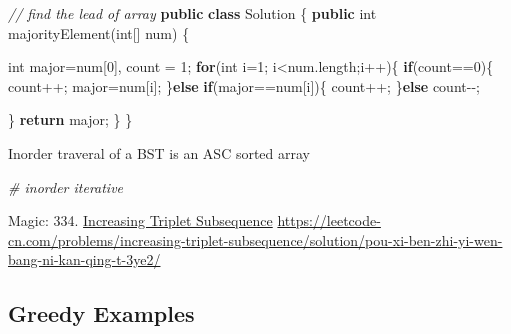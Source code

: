 \documentclass[
]{article}
\newenvironment{Shaded}{}{}
\newcommand{\CommentTok}[1]{\textcolor[rgb]{0.38,0.63,0.69}{\textit{#1}}}
\newcommand{\ControlFlowTok}[1]{\textcolor[rgb]{0.00,0.44,0.13}{\textbf{#1}}}
\newcommand{\DataTypeTok}[1]{\textcolor[rgb]{0.56,0.13,0.00}{#1}}
\newcommand{\DecValTok}[1]{\textcolor[rgb]{0.25,0.63,0.44}{#1}}
\newcommand{\FunctionTok}[1]{\textcolor[rgb]{0.02,0.16,0.49}{#1}}
\newcommand{\KeywordTok}[1]{\textcolor[rgb]{0.00,0.44,0.13}{\textbf{#1}}}
\newcommand{\NormalTok}[1]{#1}
\newcommand{\OperatorTok}[1]{\textcolor[rgb]{0.40,0.40,0.40}{#1}}
\begin{document}
\begin{Shaded}
\begin{Highlighting}[]
\CommentTok{// find the lead of array}
\KeywordTok{public} \KeywordTok{class}\NormalTok{ Solution }\OperatorTok{\{}
    \KeywordTok{public} \DataTypeTok{int} \FunctionTok{majorityElement}\OperatorTok{(}\DataTypeTok{int}\OperatorTok{[]}\NormalTok{ num}\OperatorTok{)} \OperatorTok{\{}

        \DataTypeTok{int}\NormalTok{ major}\OperatorTok{=}\NormalTok{num}\OperatorTok{[}\DecValTok{0}\OperatorTok{],}\NormalTok{ count }\OperatorTok{=} \DecValTok{1}\OperatorTok{;}
        \ControlFlowTok{for}\OperatorTok{(}\DataTypeTok{int}\NormalTok{ i}\OperatorTok{=}\DecValTok{1}\OperatorTok{;}\NormalTok{ i}\OperatorTok{\textless{}}\NormalTok{num}\OperatorTok{.}\FunctionTok{length}\OperatorTok{;}\NormalTok{i}\OperatorTok{++)\{}
            \ControlFlowTok{if}\OperatorTok{(}\NormalTok{count}\OperatorTok{==}\DecValTok{0}\OperatorTok{)\{}
\NormalTok{                count}\OperatorTok{++;}
\NormalTok{                major}\OperatorTok{=}\NormalTok{num}\OperatorTok{[}\NormalTok{i}\OperatorTok{];}
            \OperatorTok{\}}\ControlFlowTok{else} \ControlFlowTok{if}\OperatorTok{(}\NormalTok{major}\OperatorTok{==}\NormalTok{num}\OperatorTok{[}\NormalTok{i}\OperatorTok{])\{}
\NormalTok{                count}\OperatorTok{++;}
            \OperatorTok{\}}\ControlFlowTok{else}\NormalTok{ count}\OperatorTok{{-}{-};}

        \OperatorTok{\}}
        \ControlFlowTok{return}\NormalTok{ major}\OperatorTok{;}
    \OperatorTok{\}}
\OperatorTok{\}}
\end{Highlighting}
\end{Shaded}

Inorder traveral of a BST is an ASC sorted array

\begin{Shaded}
\begin{Highlighting}[]
\CommentTok{\# inorder iterative}
\end{Highlighting}
\end{Shaded}

Magic: 334.
\href{https://leetcode.com/problems/increasing-triplet-subsequence/}{Increasing
Triplet Subsequence}
\url{https://leetcode-cn.com/problems/increasing-triplet-subsequence/solution/pou-xi-ben-zhi-yi-wen-bang-ni-kan-qing-t-3ye2/}

\hypertarget{greedy-examples}{%
\subsection{Greedy Examples}\label{greedy-examples}}
\end{document}
